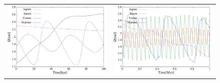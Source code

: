 \documentclass[11pt,a4paper,oneside,onecolumn]{jarticle}
\begin{document}
\begin{figure}[H]
\begin{tabular}{cc}
\begin{minipage}[t]{0.45\hsize}
\centering
\includegraphics[width=7.6cm]{./image/Nomove_capitalOMEGA_100kyr.pdf}
\end{minipage} &
\begin{minipage}[t]{0.45\hsize}
\centering
\includegraphics[width=7.6cm]{./image/Nomove_capitalOMEGA_1Myr.pdf}
\end{minipage}
%
\end{tabular}
\caption{\label{}}
\end{figure}
\end{document}
